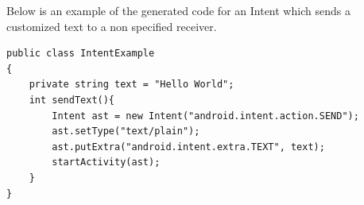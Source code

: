 Below is an example of the generated code for an Intent which sends a customized text to a non specified receiver.

{\footnotesize\begin{lstlisting}
public class IntentExample
{
	private string text = "Hello World";
	int sendText(){
		Intent ast = new Intent("android.intent.action.SEND");
		ast.setType("text/plain");
		ast.putExtra("android.intent.extra.TEXT", text);
		startActivity(ast);		
	}
}
\end{lstlisting}}